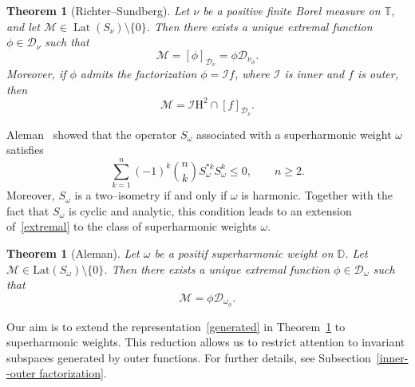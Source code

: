 \documentclass[12pt,reqno,a4paper]{amsart}
\newtheorem{theo}[prop]{Theorem}
\newcommand{\Lat}{\mathrm{Lat}}
\newcommand{\cM}{{\mathcal{M}}}
\newcommand{\hH}{\mathrm{H^2 }}
\newcommand\DD{\mathbb{D}}
\newcommand{\cD}{{\mathcal{D}}}
\numberwithin{equation}{section}
\begin{document}
	\begin{theo}[Richter--Sundberg]\label{RSdescription}
		Let $\nu$ be a positive finite Borel measure on $\mathbb{T}$, and let $\mathcal{M} \in \operatorname{Lat}(S_\nu) \setminus \{0\}$. Then there exists a unique extremal function $\phi \in \mathcal{D}_\nu$ such that
		\begin{equation}\label{extremal}
			\mathcal{M} = [\phi]_{\mathcal{D}_\nu} = \phi \mathcal{D}_{\nu_\phi}.
		\end{equation}
		Moreover, if $\phi$ admits the factorization $\phi = \mathcal{I} f$, where $\mathcal{I}$ is inner and $f$ is outer, then
		\begin{equation}\label{generated}
			\mathcal{M} = \mathcal{I} \hH \cap [f]_{\mathcal{D}_\nu}.
		\end{equation}
	\end{theo}
	Aleman~\cite{Al} showed that the operator $S_\omega$ associated with a superharmonic weight $\omega$ satisfies
	\begin{equation}\label{supernormal}
		\sum_{k=1}^n (-1)^k \binom{n}{k} S_\omega^{*k} S_\omega^k \le 0,
		\qquad n \ge 2.
	\end{equation}
	Moreover, $S_\omega$ is a two--isometry if and only if $\omega$ is harmonic. Together with the fact that $S_\omega$ is cyclic and analytic, this condition leads to an extension of~\eqref{extremal} to the class of superharmonic weights $\omega$.
	\begin{theo}[Aleman]\label{Aleman2}
		Let $\omega$ be a positif superharmonic weight on $\DD$. Let $\cM\in \Lat(S_\omega)\setminus \{0\}$. Then there exists a unique extremal function $\phi\in\cD_\omega$ such that 
		$$
		\cM=\phi\cD_{\omega_\phi}.
		$$
	\end{theo}
	Our aim is to extend the representation~\eqref{generated} in Theorem~\ref{RSdescription} to superharmonic weights. This reduction allows us to restrict attention to invariant subspaces generated by outer functions. For further details, see Subsection~\ref{inner--outer factorization}.
	
\end{document}
